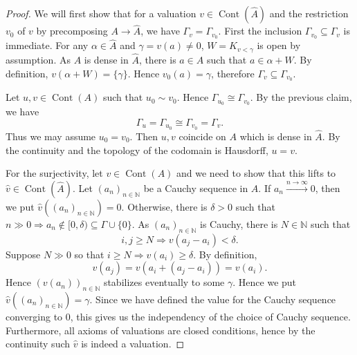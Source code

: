 \documentclass[8pt]{article}
\numberwithin{equation}{section}
\DeclareMathOperator{\Cont}{Cont}
\newcommand{\N}[0]{\mathbb{N}}
\begin{document}
\begin{proof}
    We will first show that for a valuation $v\in\Cont(\hat{A})$ and the restriction $v_0$ of $v$ by precomposing $A\to\hat{A}$, we have $\Gamma_v = \Gamma_{v_0}$. First the inclusion $\Gamma_{v_0}\subseteq\Gamma_v$ is immediate. For any $\alpha\in \hat{A}$ and $\gamma=v(a)\not=0$, $W=K_{v<\gamma}$ is open by assumption. As $A$ is dense in $\hat{A}$, there is $a\in A$ such that
    $a\in \alpha+W$. By definition, $v(\alpha+W) = \{\gamma\}$. Hence $v_0(a) = \gamma$, therefore $\Gamma_{v}\subseteq\Gamma_{v_0}$.
    \par Let $u,v\in\Cont(A)$ such that $u_0\sim v_0$. Hence $\Gamma_{u_0}\cong \Gamma_{v_0}$. By the previous claim, we have 
    \begin{equation*}
        \Gamma_u =\Gamma_{u_0} \cong \Gamma_{v_0} =\Gamma_v.
    \end{equation*}
    Thus we may assume $u_0=v_0$. Then $u,v$ coincide on $A$ which is dense in $\hat{A}$. By the continuity and the topology of the codomain is Hausdorff, $u=v$.
    \par For the surjectivity, let $v\in\Cont(A)$ and we need to show that this lifts to $\hat{v}\in\Cont(\hat{A})$. Let $(a_n)_{n\in\N}$ be a Cauchy sequence in $A$. If $a_n\stackrel{n\to\infty}{\to}0$, then we put $\hat{v}((a_n)_{n\in\N}) = 0$. 
    Otherwise, there is $\delta>0$ such that $n\gg 0\Rightarrow a_n\not\in [0,\delta)\subseteq\Gamma\cup\{0\}$. As $(a_n)_{n\in\N}$ is Cauchy, there is $N\in\N$ such that 
    \begin{equation*}
        i,j\geq N\Rightarrow v(a_j-a_i)<\delta.
    \end{equation*}
    Suppose $N\gg0$ so that $i\geq N\Rightarrow v(a_i)\geq\delta$. By definition,
    \begin{equation*}
        v(a_j) = v(a_i+(a_j-a_i)) = v(a_i).
    \end{equation*}
    Hence $(v(a_n))_{n\in\N}$ stabilizes eventually to some $\gamma$. Hence we put $\hat{v}((a_n)_{n\in\N})= \gamma$. Since we have defined the value for the Cauchy sequence converging to $0$, this gives us the independency of the choice of Cauchy sequence.
    Furthermore, all axioms of valuations are closed conditions, hence by the continuity such $\hat{v}$ is indeed a valuation.

\end{proof}
\end{document}
